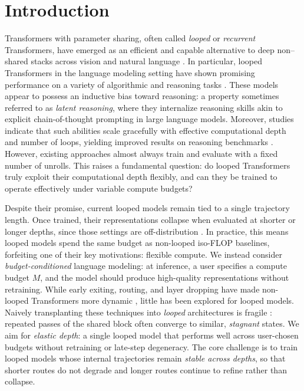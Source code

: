 \section{Introduction}

Transformers with parameter sharing, often called \emph{looped} or \emph{recurrent} Transformers, have emerged as an efficient and capable alternative to deep non–shared stacks across vision and natural language \cite{dehghani2018universal, lan2019albert, jaegle2021perceiver, dutta2021redesigning, geiping2025scaling}. In particular, looped Transformers in the language modeling setting have shown promising performance on a variety of algorithmic and reasoning tasks \cite{geiping2025scaling, saunshi2024inductive, saunshi2025reasoning,gatmiry2024can}. These models appear to possess an inductive bias toward reasoning: a property sometimes referred to as \emph{latent reasoning}, where they internalize reasoning skills akin to explicit chain-of-thought prompting in large language models. Moreover, studies indicate that such abilities scale gracefully with effective computational depth and number of loops, yielding improved results on reasoning benchmarks \cite{xu2024expressive, saunshi2025reasoning, geiping2025scaling}. However, existing approaches almost always train and evaluate with a fixed number of unrolls. This raises a fundamental question: do looped Transformers truly exploit their computational depth flexibly, and can they be trained to operate effectively under variable compute budgets?



Despite their promise, current looped models remain tied to a single trajectory length. Once trained, their representations collapse when evaluated at shorter or longer depths, since those settings are off-distribution \cite{bae2024relaxed,fan2024looped}. In practice, this means looped models spend the same budget as non-looped iso-FLOP baselines, forfeiting one of their key motivations: flexible compute. We instead consider \emph{budget-conditioned} language modeling: at inference, a user specifies a compute budget $M$, and the model should produce high-quality representations without retraining. While early exiting, routing, and layer dropping have made non-looped Transformers more dynamic \cite{schuster2022confident, fan2019reducing, elhoushi2024layerskip, shazeer2017outrageously, raposo2024mixture}, little has been explored for looped models. Naively transplanting these techniques into \emph{looped} architectures is fragile \cite{bae2025mixture, geiping2025scaling}: repeated passes of the shared block often converge to similar, \emph{stagnant} states. We aim for \emph{elastic depth}: a single looped model that performs well across user-chosen budgets without retraining or late-step degeneracy. The core challenge is to train looped models whose internal trajectories remain \emph{stable across depths}, so that shorter routes do not degrade and longer routes continue to refine rather than collapse.


